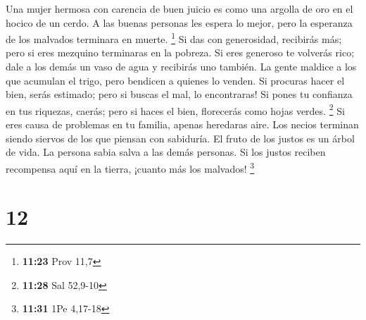 Una mujer hermosa con carencia de buen juicio es como una argolla de oro
en el hocico de un cerdo.  A las buenas personas les espera
lo mejor, pero la esperanza de los malvados terminara en muerte.
\footnote{\textbf{11:23} Prov 11,7}  Si das con
generosidad, recibirás más; pero si eres mezquino terminaras en la
pobreza.  Si eres generoso te volverás rico; dale a los
demás un vaso de agua y recibirás uno también.  La gente
maldice a los que acumulan el trigo, pero bendicen a quienes lo venden.
 Si procuras hacer el bien, serás estimado; pero si buscas
el mal, lo encontraras!  Si pones tu confianza en tus
riquezas, caerás; pero si haces el bien, florecerás como hojas verdes.
\footnote{\textbf{11:28} Sal 52,9-10}  Si eres causa de
problemas en tu familia, apenas heredaras aire. Los necios terminan
siendo siervos de los que piensan con sabiduría.  El fruto
de los justos es un árbol de vida. La persona sabia salva a las demás
personas.  Si los justos reciben recompensa aquí en la
tierra, ¡cuanto más los malvados! \footnote{\textbf{11:31} 1Pe 4,17-18}

\hypertarget{section-11}{%
\section{12}\label{section-11}}

